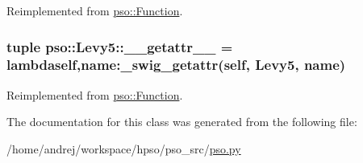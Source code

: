 Reimplemented from \hyperlink{classpso_1_1Function_5bddc07dbaab0ee579488bdcc8103a71}{pso::Function}.\hypertarget{classpso_1_1Levy5_736e2ec83417ab688a210eb7045f606c}{
\subsubsection{\setlength{\rightskip}{0pt plus 5cm}tuple {\bf pso::Levy5::\_\-\_\-getattr\_\-\_\-} = lambdaself,name:\_\-swig\_\-getattr(self, {\bf Levy5}, name)}}
\label{classpso_1_1Levy5_736e2ec83417ab688a210eb7045f606c}




Reimplemented from \hyperlink{classpso_1_1Function_affeed856b337656e88895fa35321496}{pso::Function}.

The documentation for this class was generated from the following file:\begin{CompactItemize}
\item 
/home/andrej/workspace/hpso/pso\_\-src/\hyperlink{pso_8py}{pso.py}\end{CompactItemize}
